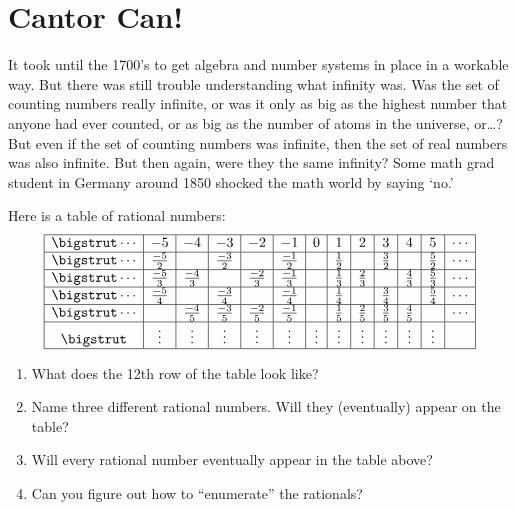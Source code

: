 \newpage
\section{Cantor Can!}


It took until the 1700's to get algebra and number systems in place in
a workable way.  But there was still trouble understanding what
infinity was.  Was the set of counting numbers really infinite, or was
it only as big as the highest number that anyone had ever counted, or
as big as the number of atoms in the universe, or\dots?  But even if the
set of counting numbers was infinite, then the set of real numbers was
also infinite.  But then again, were they the same infinity?  Some
math grad student in Germany around 1850 shocked the math world by
saying `no.'


\begin{prob}
Here is a table of rational numbers:
\[
\begin{array}{|c|c|c|c|c|c|c|c|c|c|c|c|c|}\hline\bigstrut
\cdots & -5 & -4 & -3 & -2 & -1 & 0 & 1 & 2 & 3 & 4 & 5 & \cdots\\\hline\bigstrut
\cdots &\frac{-5}{2} & & \frac{-3}{2} &  & \frac{-1}{2} &   & \frac{1}{2} &  & \frac{3}{2} &  & \frac{5}{2} & \cdots\\\hline\bigstrut
\cdots & \frac{-5}{3} & \frac{-4}{3} & & \frac{-2}{3} & \frac{-1}{3} & & \frac{1}{3} & \frac{2}{3} & & \frac{4}{3} & \frac{5}{3} & \cdots\\\hline\bigstrut
\cdots & \frac{-5}{4} & & \frac{-3}{4} & & \frac{-1}{4} & & \frac{1}{4} & & \frac{3}{4} & & \frac{5}{4} & \cdots\\\hline\bigstrut
\cdots &  & \frac{-4}{5} & \frac{-3}{5} & \frac{-2}{5} & \frac{-1}{5} & & \frac{1}{5} & \frac{2}{5} & \frac{3}{5} & \frac{4}{5} &  & \cdots\\\hline\bigstrut
       & \vdots & \vdots & \vdots & \vdots & \vdots & \vdots & \vdots & \vdots & \vdots & \vdots & \vdots & \\\hline
\end{array}
\]
\begin{enumerate}
\item What does the 12th row of the table look like? 
\item Name three different rational numbers. Will they (eventually) appear on the table?
\item Will every rational number eventually appear in the table above?
\item Can you figure out how to ``enumerate'' the rationals?
\end{enumerate}
\end{prob}


